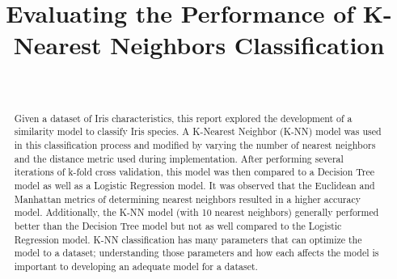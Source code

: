 \documentclass[journal]{IEEEtran}
\begin{document}
\setlength{\emergencystretch}{12pt}
\setlength{\parindent}{10pt}



\lstset{style=mystyle}

\title{Evaluating the Performance of K-Nearest Neighbors Classification}

\author{
\\
}

\maketitle

\begin{abstract}
\label{log:abstract}
Given a dataset of Iris characteristics, this report explored the development of a similarity model to classify Iris species. A K-Nearest Neighbor (K-NN) model was used in this classification process and modified by varying the number of nearest neighbors and the distance metric used during implementation. After performing several iterations of k-fold cross validation, this model was then compared to a Decision Tree model as well as a Logistic Regression model. It was observed that the Euclidean and Manhattan metrics of determining nearest neighbors resulted in a higher accuracy model. Additionally, the K-NN model (with 10 nearest neighbors) generally performed better than the Decision Tree model but not as well compared to the Logistic Regression model. K-NN classification has many parameters that can optimize the model to a dataset; understanding those parameters and how each affects the model is important to developing an adequate model for a dataset.

\end{abstract}
\end{document}
